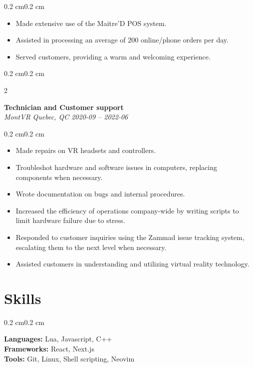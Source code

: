 \documentclass[10pt, letterpaper]{article}
\newenvironment{highlights}{%
    \begin{itemize}[
        topsep=0.10 cm,%
        parsep=0.10 cm,%
        partopsep=0pt,%
        itemsep=0pt,%
        leftmargin=0.4 cm + 10pt%
    ]
}{%
    \end{itemize}%
}
\newenvironment{onecolentry}{%
    \begin{adjustwidth}{0.2 cm}{0.2 cm}%
}{%
    \end{adjustwidth}%
}
\newenvironment{twocolentry}[2][]{%
    \begin{onecolentry}%
    \def\secondColumn{#2}%
    \begin{paracol}{2}%
}{%
    \switchcolumn%
    \raggedleft%
    \secondColumn%
    \end{paracol}%
    \end{onecolentry}%
}
\begin{document}
\vspace{0.10 cm}
\begin{onecolentry}
    \begin{highlights}
        \item Made extensive use of the Maitre'D POS system.
        \item Assisted in processing an average of 200 online/phone orders per day.
        \item Served customers, providing a warm and welcoming experience.
    \end{highlights}
\end{onecolentry}
\vspace{0.2 cm}
\begin{twocolentry}{\textit{ Quebec, QC \hspace{0.5em}2020-09 -- 2022-06 }}
    \textbf{ Technician and Customer support }\\
    \textit{ MontVR }
\end{twocolentry}
\vspace{0.10 cm}
\begin{onecolentry}
    \begin{highlights}
        \item Made repairs on VR headsets and controllers.
        \item Troubleshot hardware and software issues in computers, replacing components when necessary.
        \item Wrote documentation on bugs and internal procedures.
        \item Increased the efficiency of operations company-wide by writing scripts to limit hardware failure due to stress.
        \item Responded to customer inquiries using the Zammad issue tracking system, escalating them to the next level when necessary.
        \item Assisted customers in understanding and utilizing virtual reality technology.
    \end{highlights}
\end{onecolentry}
\vspace{0.2 cm}


\section{Skills}
\begin{onecolentry}
    \textbf{Languages:} Lua, Javascript, C++\\
    \textbf{Frameworks:} React, Next.js\\
    \textbf{Tools:} Git, Linux, Shell scripting, Neovim\\
\end{onecolentry}
\end{document}
